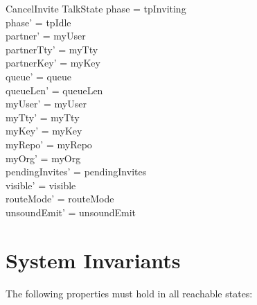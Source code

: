 \documentclass[a4paper,10pt,fleqn]{article}
\begin{document}
\begin{schema}{CancelInvite}
  \Delta TalkState
\where
  phase = tpInviting \\
  phase' = tpIdle \\
  partner' = myUser \\
  partnerTty' = myTty \\
  partnerKey' = myKey \\
  queue' = queue \\
  queueLen' = queueLen \\
  myUser' = myUser \\
  myTty' = myTty \\
  myKey' = myKey \\
  myRepo' = myRepo \\
  myOrg' = myOrg \\
  pendingInvites' = pendingInvites \\
  visible' = visible \\
  routeMode' = routeMode \\
  unsoundEmit' = unsoundEmit
\end{schema}

\section{System Invariants}

The following properties must hold in all reachable states:
\end{document}

